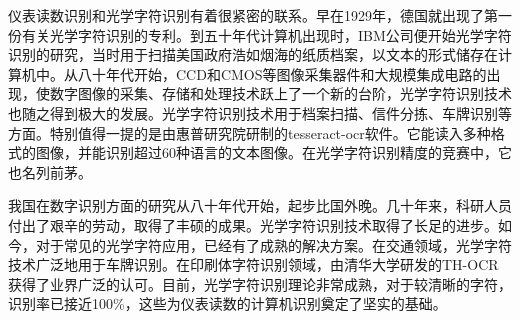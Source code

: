 仪表读数识别和光学字符识别有着很紧密的联系。早在1929年，德国就出现了第一份有关光学字符识别的专利。到五十年代计算机出现时，IBM公司便开始光学字符识别的研究，当时用于扫描美国政府浩如烟海的纸质档案，以文本的形式储存在计算机中。从八十年代开始，CCD和CMOS等图像采集器件和大规模集成电路的出现，使数字图像的采集、存储和处理技术跃上了一个新的台阶，光学字符识别技术也随之得到极大的发展。光学字符识别技术用于档案扫描、信件分拣、车牌识别等方面。特别值得一提的是由惠普研究院研制的tesseract-ocr软件。它能读入多种格式的图像，并能识别超过60种语言的文本图像。在光学字符识别精度的竞赛中，它也名列前茅。

我国在数字识别方面的研究从八十年代开始，起步比国外晚。几十年来，科研人员付出了艰辛的劳动，取得了丰硕的成果。光学字符识别技术取得了长足的进步。如今，对于常见的光学字符应用，已经有了成熟的解决方案。在交通领域，光学字符技术广泛地用于车牌识别。在印刷体字符识别领域，由清华大学研发的TH-OCR获得了业界广泛的认可。目前，光学字符识别理论非常成熟，对于较清晰的字符，识别率已接近100\%，这些为仪表读数的计算机识别奠定了坚实的基础。

